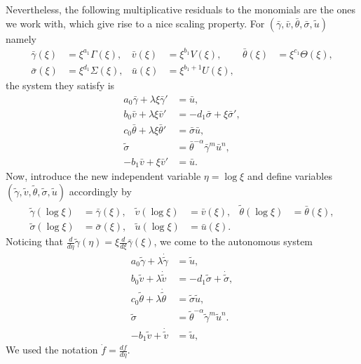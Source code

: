 \documentclass[a4paper,11pt]{article}
\def\bg{{\bar{\gamma}}}
\def\bv{{\bar{v}}}
\def\bth{{\bar{\theta}}}
\def\bs{{\bar{\sigma}}}
\def\bu{{\bar{u}}}
\def\tg{{\tilde{\gamma}}}
\def\tv{{\tilde{v}}}
\def\tth{{\tilde{\theta}}}
\def\ts{{\tilde{\sigma}}}
\def\tu{{\tilde{u}}}
\def\dtg{{\dot{\tilde{\gamma}}}}
\def\dtv{{\dot{\tilde{v}}}}
\def\dtth{{\dot{\tilde{\theta}}}}
\def\dts{{\dot{\tilde{\sigma}}}}
\theoremstyle{remark}
\begin{document}
Nevertheless, the following multiplicative residuals to the monomials are the ones we work with, which give rise to a nice scaling property. For $(\bg,\bv,\bth,\bs,\tu)$ namely
\begin{equation} \label{eq:CAPtoBAR}
\begin{aligned}
 \bg(\xi)&=\xi^{a_1}\Gamma(\xi), &
 \bv(\xi)&=\xi^{b_1}V(\xi), &
 \bth(\xi)&=\xi^{c_1}\Theta(\xi), \\
 \bs(\xi)&=\xi^{d_1}\Sigma(\xi), &
 \bu(\xi)&=\xi^{b_1+1}U(\xi),
\end{aligned}
\end{equation}
the system they satisfy is
\begin{equation} \label{eq:barsys}
 \begin{aligned}
  a_0\bg + \lambda\xi\bg' &=\bu,\\
  b_0\bv + \lambda\xi\bv' &=-d_1 \bs + \xi\bs',\\
  c_0\bth+ \lambda\xi\bth'&=\bs\bu,\\
  \ts &=\bth^{-\alpha}\bg^m\bu^n,\\
  -b_1\bv+\xi\bv' &= \bu.
 \end{aligned}
\end{equation}
Now, introduce the new independent variable $\eta = \log\xi$ and define variables $(\tg,\tv,\tth,\ts,\tu)$ accordingly by
\begin{equation} \label{eq:BARtoTIL}
\begin{aligned}
 \tg(\log\xi)&=\bg(\xi), &
 \tv(\log\xi)&=\bv(\xi), &
 \tth(\log\xi)&=\bth(\xi), \\
 \ts(\log\xi)&=\bs(\xi), &
 \tu(\log\xi)&=\bu(\xi).
\end{aligned}
\end{equation}
Noticing that $\frac{d}{d\eta}\tg(\eta) = \xi \frac{d}{d\xi}\bg(\xi)$, we come to the autonomous system
\begin{equation} \label{eq:tildesys}
 \begin{aligned}
  a_0\tg + \lambda\dtg &=\tu,\\
  b_0\tv + \lambda\dtv &=-d_1 \ts + \dts,\\
  c_0\tth+ \lambda\dtth&=\ts\tu,\\
  \ts &=\tth^{-\alpha}\tg^m\tu^n.\\
  -b_1\tv+\dtv &= \tu,
 \end{aligned}
\end{equation}
We used the notation $\dot{f}=\frac{df}{d\eta}$.
\end{document}
